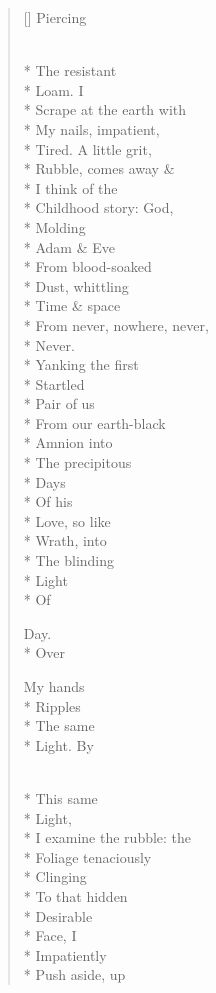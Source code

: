 \begin{verse}[\versewidth]
Piercing

\\*
The resistant\\*
Loam.   I\\*
Scrape at the earth with\\*
My nails, impatient,\\*
Tired.   A little grit,\\*
Rubble, comes away \&\\*
I think of the\\*
Childhood story: God, \\*
Molding\\*
Adam \& Eve\\*
From blood-soaked\\*
Dust, whittling\\*
Time \& space\\*
From never, nowhere, never,\\*
Never.\\*
Yanking the first\\*
Startled \\*
Pair of us\\*
From our earth-black\\*
Amnion     into\\*
The precipitous\\*
Days \\*
Of his\\*
Love, so like\\*
Wrath, into \\*
The blinding\\*
Light\\*
Of

Day.\\*
Over

My hands\\*
Ripples\\*
The same\\*
Light.    By

\\*
This same\\*
Light,\\*
I examine the rubble: the\\*
Foliage tenaciously\\*
Clinging\\*
To that hidden\\*
Desirable\\*
Face, I\\*
Impatiently\\*
Push aside, up


\end{verse}
